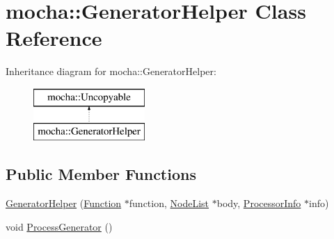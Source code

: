 \hypertarget{classmocha_1_1_generator_helper}{
\section{mocha::GeneratorHelper Class Reference}
\label{classmocha_1_1_generator_helper}
}
Inheritance diagram for mocha::GeneratorHelper:\begin{figure}[H]
\begin{center}
\leavevmode
\includegraphics[height=2.000000cm]{classmocha_1_1_generator_helper}
\end{center}
\end{figure}
\subsection*{Public Member Functions}
\begin{DoxyCompactItemize}
\item 
\hyperlink{classmocha_1_1_generator_helper_ac1c4804b12a9ef7438e274ef5cb90be8}{GeneratorHelper} (\hyperlink{classmocha_1_1_function}{Function} $\ast$function, \hyperlink{classmocha_1_1_node_list}{NodeList} $\ast$body, \hyperlink{classmocha_1_1_processor_info}{ProcessorInfo} $\ast$info)
\item 
void \hyperlink{classmocha_1_1_generator_helper_a9f4020d849b46ac4915c78507753db84}{ProcessGenerator} ()
\end{DoxyCompactItemize}
